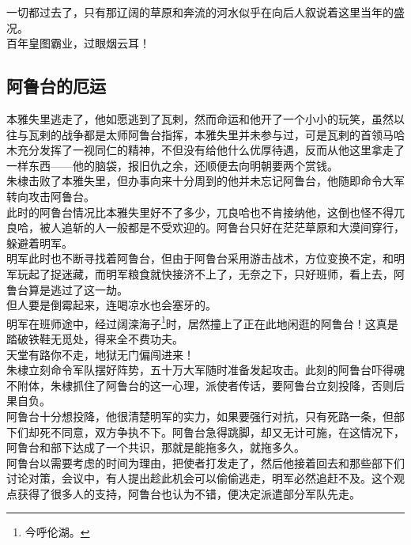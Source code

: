 \begin{multicols}{\theparacolNo}
一切都过去了，只有那辽阔的草原和奔流的河水似乎在向后人叙说着这里当年的盛况。\\

百年皇图霸业，过眼烟云耳！\\

\subsection{阿鲁台的厄运}
本雅失里逃走了，他如愿逃到了瓦剌，然而命运和他开了一个小小的玩笑，虽然以往与瓦剌的战争都是太师阿鲁台指挥，本雅失里并未参与过，可是瓦剌的首领马哈木充分发挥了一视同仁的精神，不但没有给他什么优厚待遇，反而从他这里拿走了一样东西——他的脑袋，报旧仇之余，还顺便去向明朝要两个赏钱。\\

朱棣击败了本雅失里，但办事向来十分周到的他并未忘记阿鲁台，他随即命令大军转向攻击阿鲁台。\\

此时的阿鲁台情况比本雅失里好不了多少，兀良哈也不肯接纳他，这倒也怪不得兀良哈，被人追斩的人一般都是不受欢迎的。阿鲁台只好在茫茫草原和大漠间穿行，躲避着明军。\\

明军此时也不断寻找着阿鲁台，但由于阿鲁台采用游击战术，方位变换不定，和明军玩起了捉迷藏，而明军粮食就快接济不上了，无奈之下，只好班师，看上去，阿鲁台算是逃过了这一劫。\\

但人要是倒霉起来，连喝凉水也会塞牙的。\\

明军在班师途中，经过阔滦海子\footnote{今呼伦湖。}时，居然撞上了正在此地闲逛的阿鲁台！这真是踏破铁鞋无觅处，得来全不费功夫。\\

天堂有路你不走，地狱无门偏闯进来！\\

朱棣立刻命令军队摆好阵势，五十万大军随时准备发起攻击。此刻的阿鲁台吓得魂不附体，朱棣抓住了阿鲁台的这一心理，派使者传话，要阿鲁台立刻投降，否则后果自负。\\

阿鲁台十分想投降，他很清楚明军的实力，如果要强行对抗，只有死路一条，但部下们却死不同意，双方争执不下。阿鲁台急得跳脚，却又无计可施，在这情况下，阿鲁台和部下达成了一个共识，那就是能拖多久，就拖多久。\\

阿鲁台以需要考虑的时间为理由，把使者打发走了，然后他接着回去和那些部下们讨论对策，会议中，有人提出趁此机会可以偷偷逃走，明军必然追赶不及。这个观点获得了很多人的支持，阿鲁台也认为不错，便决定派遣部分军队先走。\\


\end{multicols}
